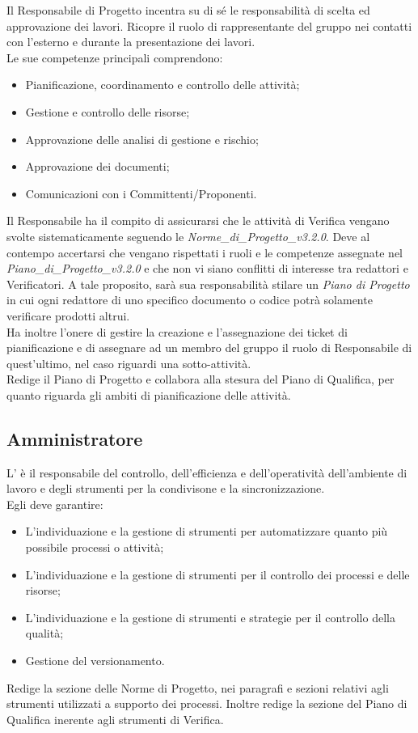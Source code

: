 Il Responsabile di Progetto incentra su di sé le responsabilità di scelta ed approvazione dei lavori. Ricopre il ruolo di rappresentante del gruppo nei contatti con l'esterno e durante la presentazione dei lavori.\\
Le sue competenze principali comprendono:
\begin{itemize}
\item Pianificazione, coordinamento e controllo delle attività;
\item Gestione e controllo delle risorse;
\item Approvazione delle analisi di gestione e rischio;
\item Approvazione dei documenti;
\item Comunicazioni con i Committenti/Proponenti.
\end{itemize}
Il Responsabile ha il compito di assicurarsi che le attività di Verifica vengano svolte sistematicamente seguendo le \emph{Norme\_di\_Progetto\_v3.2.0}. Deve al contempo accertarsi che vengano rispettati i ruoli e le competenze assegnate nel \emph{Piano\_di\_Progetto\_v3.2.0} e che non vi siano conflitti di interesse tra redattori e Verificatori. A tale proposito, sarà sua responsabilità stilare un \emph{Piano di Progetto} in cui ogni redattore di uno specifico documento o codice potrà solamente verificare prodotti altrui.\\
Ha inoltre l'onere di gestire la creazione e l'assegnazione dei ticket di pianificazione e di assegnare ad un membro del gruppo il ruolo di Responsabile di quest'ultimo, nel caso riguardi una sotto-attività.\\
Redige il Piano di Progetto e collabora alla stesura del Piano di Qualifica, per quanto riguarda gli ambiti di pianificazione delle attività.

\subsection{Amministratore}

L' è il responsabile del controllo, dell'efficienza e dell'operatività dell'ambiente di lavoro e degli strumenti per la condivisone e la sincronizzazione.\\
Egli deve garantire:
\begin{itemize}
\item L'individuazione e la gestione di strumenti per automatizzare quanto più possibile processi o attività;
\item L'individuazione e la gestione di strumenti per il controllo dei processi e delle risorse;
\item L'individuazione e la gestione di strumenti e strategie per il controllo della qualità;
\item Gestione del versionamento.
\end{itemize}
Redige la sezione delle Norme di Progetto, nei paragrafi e sezioni relativi agli strumenti utilizzati a supporto dei processi. Inoltre redige la sezione del Piano di Qualifica inerente agli strumenti di Verifica.

